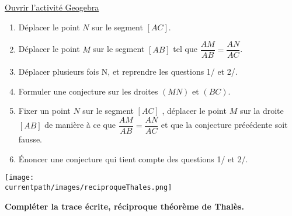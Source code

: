 \begin{activite}        
        \href{https://www.geogebra.org/m/nztvwr9b}{ Ouvrir l'activité Geogebra}

        \begin{enumerate}
            \item Déplacer le point $N$ sur le segment $[AC]$.
            \item Déplacer le point $M$ sur le segment $[AB]$ tel que $\dfrac{AM}{AB}=\dfrac{AN}{AC}$.
            \item Déplacer plusieurs fois N, et reprendre les questions 1/ et 2/.
            \item Formuler une conjecture sur les droites $(MN)$ et $(BC)$.
            \item Fixer un point $N$ sur le segment $[AC]$ , déplacer le point $M$ sur la droite $[AB]$
            de manière à ce que $\dfrac{AM}{AB}=\dfrac{AN}{AC}$ et que la conjecture précédente soit fausse.
            \item Énoncer une conjecture qui tient compte des questions 1/ et 2/.
        \end{enumerate}

        \begin{center}
            \texttt{[image: \\currentpath/images/reciproqueThales.png]}
        \end{center}

        \textbf{Compléter la trace écrite, réciproque théorème de Thalès.}
\end{activite}
